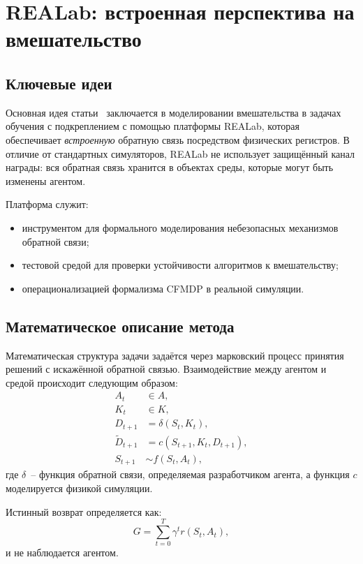 \section{REALab: встроенная перспектива на вмешательство}

\subsection{Ключевые идеи}

Основная идея статьи~\cite{kumar2020realab} заключается в моделировании вмешательства 
в задачах обучения с подкреплением с помощью платформы REALab, которая 
обеспечивает \emph{встроенную} обратную связь посредством физических регистров. 
В отличие от стандартных симуляторов, REALab не использует защищённый канал 
награды: вся обратная связь хранится в объектах среды, которые могут быть 
изменены агентом.

Платформа служит:
\begin{itemize}
    \item инструментом для формального моделирования небезопасных механизмов обратной связи;
    \item тестовой средой для проверки устойчивости алгоритмов к вмешательству;
    \item операционализацией формализма CFMDP в реальной симуляции.
\end{itemize}

\subsection{Математическое описание метода}

Математическая структура задачи задаётся через марковский процесс принятия решений 
с искажённой обратной связью. Взаимодействие между агентом и средой происходит следующим образом:
\begin{equation}
\begin{aligned}
A_t &\in A, \\
K_t &\in K, \\
D_{t+1} &= \delta(S_t, K_t), \\
\tilde{D}_{t+1} &= c(S_{t+1}, K_t, D_{t+1}), \\
S_{t+1} &\sim f(S_t, A_t),
\end{aligned}
\end{equation}
где $\delta$~-- функция обратной связи, определяемая разработчиком агента, а функция $c$ моделируется физикой симуляции.

Истинный возврат определяется как:
\begin{equation}
G = \sum_{t=0}^{T} \gamma^t r(S_t, A_t),
\end{equation}
и не наблюдается агентом.


